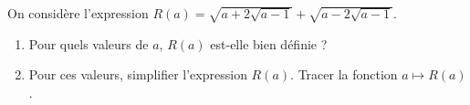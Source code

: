
\begin{exercice}
On consid\`ere l'expression $R(a)=\sqrt{a+2\sqrt{a-1}}+\sqrt{a-2\sqrt{a-1}}$.
\begin{enumerate}
 \item Pour quels valeurs de $a$, $R(a)$ est-elle bien d\'efinie ? 
\item Pour ces valeurs, simplifier l'expression $R(a)$. Tracer la fonction $a\mapsto R(a)$.
\end{enumerate}
\end{exercice}
